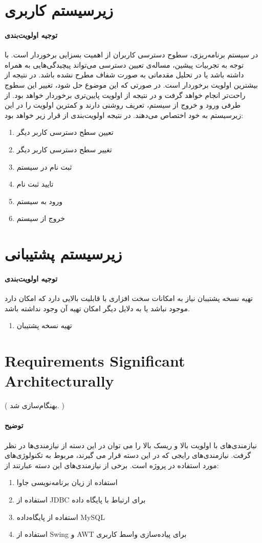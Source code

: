 \section{زیرسیستم کاربری}
\paragraph{توجیه اولویت‌بندی}
در سیستم برنامه‌ریزی، سطوح دسترسی کاربران از اهمیت بسزایی برخوردار است. با توجه به تجربیات پیشین، مساله‌ی تعیین دسترسی می‌تواند پیچیدگی‌هایی به همراه داشته باشد یا در تحلیل مقدماتی به صورت  شفاف مطرح نشده باشد. در نتیجه از بیشترین اولویت برخوردار است. در صورتی که این موضوع حل شود، تغییر این سطوج راحت‌تر انجام خواهد گرفت و در نتیجه از اولویت پایین‌تری برخوردار خواهد بود. از طرفی ورود و خروج از سیستم، تعریف روشنی دارند و کمترین اولویت را در این زیرسیستم به خود اختصاص می‌دهند. در نتیجه اولویت‌بندی از قرار زیر خواهد بود:
\begin{enumerate}
	\item تعیین سطح دسترسی کاربر دیگر
	\item تغییر سطح دسترسی کاربر دیگر
	\item ثبت نام در سیستم
	\item تایید ثبت نام
	\item ورود به سیستم
	\item خروج از سیستم			
\end{enumerate}

\section{زیرسیستم پشتیبانی}
\paragraph{توجیه اولویت‌بندی}
تهیه نسخه پشتیبان نیاز به امکانات سخت افزاری با قابلیت بالایی دارد که امکان دارد موجود نباشد یا به دلایل دیگر امکان تهیه آن وجود نداشته باشد.
\begin{enumerate}
	
	\item تهیه نسخه پشتیبان
\end{enumerate}

\section{Requirements Significant Architecturally}
({\color{red} بهنگام‌سازی شد.}	)
\paragraph{توضیح}
نیازمندی‌های با اولویت بالا و ریسک بالا را می توان در این دسته از نیازمندی‌ها در نظر گرفت. نیازمندی‌های رایجی که در این دسته قرار می گیرند، مربوط به تکنولوژی‌های مورد استفاده در پروژه است. برخی از نیازمندی‌های این دسته عبارتند از:
\begin{enumerate}
	\item استفاده از زیان برنامه‌نویسی جاوا
	\item استفاده از JDBC برای ارتباط با پایگاه داده
	\item استفاده از پایگاه‌داده MySQL
	\item استفاده از Swing و AWT برای پیاده‌سازی واسط کاربری
\end{enumerate}

